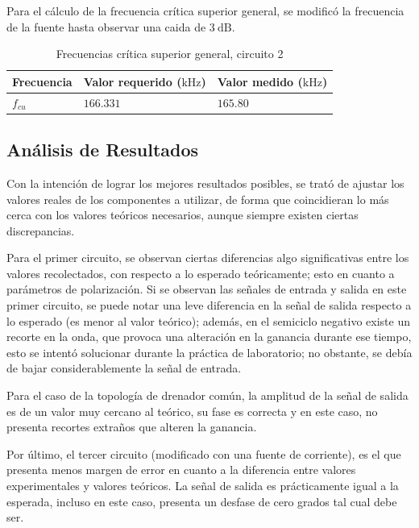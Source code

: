 \documentclass[journal]{IEEEtran}
\begin{document}
Para el cálculo de la frecuencia crítica superior general, se modificó la frecuencia de la fuente hasta observar una caida de $3~\mathrm{dB}$.

\begin{table}[H]
        \centering
        \renewcommand{\arraystretch}{1.5}
        \caption{Frecuencias crítica superior general, circuito 2}
        \begin{tabular}{ >{\centering\arraybackslash}m{2.5cm} >{\centering\arraybackslash}m{2.5cm} >{\centering\arraybackslash}m{2.5cm} }
                \hline
            Frecuencia & Valor requerido ($\mathrm{kHz}$) & Valor medido ($\mathrm{kHz}$)\\ 
            \hline
            \centering
            $f_{cu}$ & $166.331$  & $165.80$  \\ 
            \hline
        \end{tabular}
        \label{tabla7}
    \end{table}   

\subsection{Análisis de Resultados}
Con la intención de lograr los mejores resultados posibles, se trató de ajustar los 
valores reales de los componentes a utilizar, de forma que coincidieran lo más cerca con
los valores teóricos necesarios, aunque siempre existen ciertas discrepancias.

Para el primer circuito, se observan ciertas diferencias algo significativas entre los valores
recolectados, con respecto a lo esperado teóricamente; esto en cuanto a parámetros de polarización. 
Si se observan las señales de entrada y salida en este primer circuito, se puede notar una leve diferencia
en la señal de salida respecto a lo esperado (es menor al valor teórico); además, en el semiciclo negativo
existe un recorte en la onda, que provoca una alteración en la ganancia durante ese tiempo, esto se intentó 
solucionar durante la práctica de laboratorio; no obstante, se debía de bajar considerablemente la señal de entrada.

Para el caso de la topología de drenador común, la amplitud de la señal de salida es de un valor muy cercano al teórico, 
su fase es correcta y en este caso, no presenta recortes extraños que alteren la ganancia. 

Por último, el tercer circuito (modificado con una fuente de corriente), es el que presenta menos margen de error
en cuanto a la diferencia entre valores experimentales y valores teóricos. La señal de salida es prácticamente
igual a la esperada, incluso en este caso, presenta un desfase de cero grados tal cual debe ser. 
\end{document}
